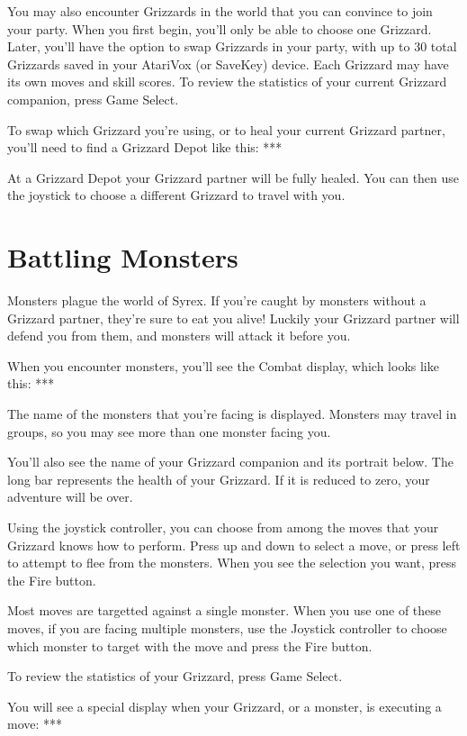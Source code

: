 \documentclass[10pt,twoside,openright]{memoir}
\begin{document}
You may also encounter Grizzards in the world that you can convince to join
your party. When you first begin, you'll only be able to choose one
Grizzard. Later, you'll have the option to swap Grizzards in your party,
with up to 30 total Grizzards saved in your AtariVox (or SaveKey) device.
Each Grizzard may have its own moves and skill scores. To review the
statistics of your current Grizzard companion, press Game Select.

To swap which Grizzard you're using, or to heal your current Grizzard
partner, you'll need to find a Grizzard Depot like this: ***

At a Grizzard Depot your Grizzard partner will be fully healed. You can
then use the joystick to choose a different Grizzard to travel with you.


\section{Battling Monsters}

Monsters plague the world of Syrex. If you're caught by monsters without a
Grizzard partner, they're sure to eat you alive! Luckily your Grizzard
partner will defend you from them, and monsters will attack it before you.

When you encounter monsters, you'll see the Combat display, which looks like
this: ***

The name of the monsters that you're facing is displayed. Monsters may
travel in groups, so you may see more than one monster facing you.

You'll also see the name of your Grizzard companion and its portrait below.
The long bar represents the health of your Grizzard. If it is reduced to
zero, your adventure will be over.

Using the joystick controller, you can choose from among the moves that your
Grizzard knows how to perform. Press up and down to select a move, or press
left to attempt to flee from the monsters. When you see the selection you
want, press the Fire button.

Most moves are targetted against a single monster.  When you use one of
these moves, if you are facing multiple monsters, use the Joystick
controller to choose which monster to target with the move and press the
Fire button.

To review the statistics of your Grizzard, press Game Select.

You will see a special display when your Grizzard, or a monster, is
executing a move: ***
\end{document}
